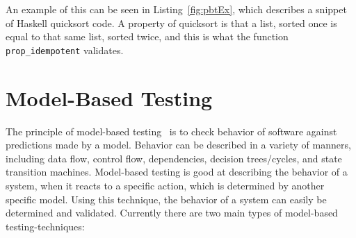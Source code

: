 An example of this can be seen in Listing~\ref{fig:pbtEx}, which describes a snippet of Haskell quicksort code. A property of quicksort is that a list, sorted once is equal to that same list, sorted twice, and this is what the function \lstinline{prop_idempotent} validates.

\section{Model-Based Testing}

The principle of model-based testing~\cite{mbt} is to check behavior of software against predictions made by a model. Behavior can be described in a variety of manners, including data flow, control flow, dependencies, decision trees/cycles, and state transition machines. Model-based testing is good at describing the behavior of a system, when it reacts to a specific action, which is determined by another specific model. Using this technique, the behavior of a system can easily be determined and validated. Currently there are two main types of model-based testing-techniques:

